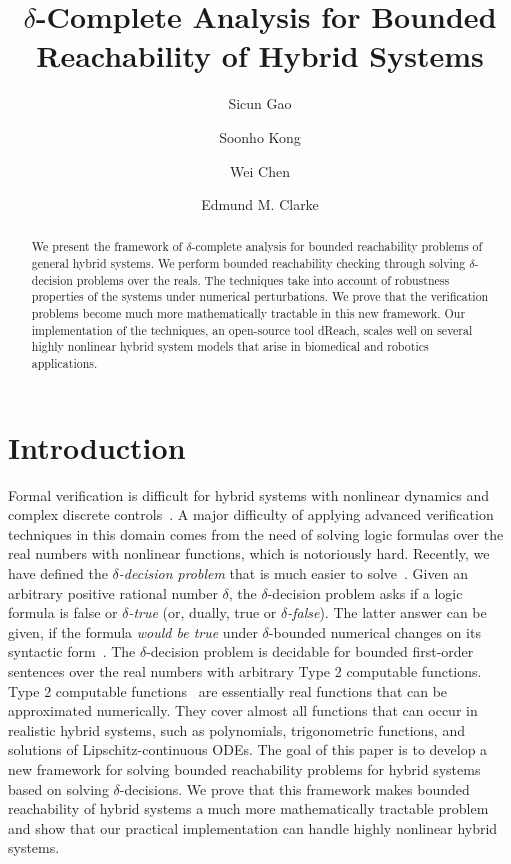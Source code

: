 \documentclass[10pt,envcountsect]{llncs}
\title{$\delta$-Complete Analysis for Bounded Reachability of Hybrid Systems}
\author{Sicun Gao \and Soonho Kong \and Wei Chen \and Edmund M. Clarke}
\institute{Carnegie Mellon University, Pittsburgh, PA 15213}
\begin{document}
\maketitle

\begin{abstract}
We present the framework of $\delta$-complete analysis for bounded reachability problems of general hybrid systems. We perform bounded reachability checking through solving $\delta$-decision problems over the reals. The techniques take into account of robustness properties of the systems under numerical perturbations. We prove that the verification problems become much more mathematically tractable in this new framework. Our implementation of the techniques, an open-source tool {\sf dReach}, scales well on several highly nonlinear hybrid system models that arise in biomedical and robotics applications.
\end{abstract}

\section{Introduction}
Formal verification is difficult for hybrid systems with nonlinear dynamics and complex discrete controls~\cite{DBLP:conf/emsoft/Alur11,DBLP:conf/lics/Henzinger96}. A major difficulty of applying advanced verification techniques in this domain comes from the need of solving logic formulas over the real numbers with nonlinear functions, which is notoriously hard. Recently, we have defined the {\em $\delta$-decision problem} that is much easier to solve~\cite{DBLP:conf/lics/GaoAC12,DBLP:conf/cade/GaoAC12}. Given an arbitrary positive rational number $\delta$, the $\delta$-decision problem asks if a logic formula is false or {\em $\delta$-true} (or, dually, true or {\em $\delta$-false}). The latter answer can be given, if the formula {\em would be true} under $\delta$-bounded numerical changes on its syntactic form~\cite{DBLP:conf/lics/GaoAC12}. The $\delta$-decision problem is decidable for bounded first-order sentences over the real numbers with arbitrary Type 2 computable functions. Type 2 computable functions~\cite{CAbook} are essentially real functions that can be approximated numerically. They cover almost all functions that can occur in realistic hybrid systems, such as polynomials, trigonometric functions, and solutions of Lipschitz-continuous ODEs. The goal of this paper is to develop a new framework for solving bounded reachability problems for hybrid systems based on solving $\delta$-decisions. We prove that this framework makes bounded reachability of hybrid systems a much more mathematically tractable problem and show that our practical implementation can handle highly nonlinear hybrid systems.
\end{document}
